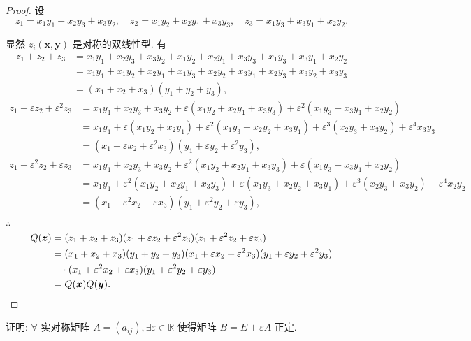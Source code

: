 \documentclass[color=black,device=normal,lang=cn,mode=geye]{elegantnote}
\begin{document}
\begin{proof}
    设
    \[z_1=x_1y_1+x_2y_3+x_3y_2,\quad z_2=x_1y_2+x_2y_1+x_3y_3,\quad z_3=x_1y_3+x_3y_1+x_2y_2.\]

    显然 $z_i(\boldsymbol{x},\boldsymbol{y})$ 是对称的双线性型. 有
    \begin{align*}
        z_1+z_2+z_3 & =x_1y_1+x_2y_3+x_3y_2+x_1y_2+x_2y_1+x_3y_3+x_1y_3+x_3y_1+x_2y_2 \\
        & =x_1y_1+x_1y_2+x_2y_1+x_1y_3+x_2y_2+x_3y_1+x_2y_3+x_3y_2+x_3y_3 \\
        & =(x_1+x_2+x_3)(y_1+y_2+y_3),
    \end{align*}
    \begin{align*}
        z_1+\varepsilon z_2+\varepsilon^2z_3 & =x_1y_1+x_2y_3+x_3y_2+\varepsilon(x_1y_2+x_2y_1+x_3y_3)+\varepsilon^2(x_1y_3+x_3y_1+x_2y_2) \\
        & =x_1y_1+\varepsilon(x_1y_2+x_2y_1)+\varepsilon^2(x_1y_3+x_2y_2+x_3y_1)+\varepsilon^3(x_2y_3+x_3y_2)+\varepsilon^4x_3y_3 \\
        & =(x_1+\varepsilon x_2+\varepsilon^2x_3)(y_1+\varepsilon y_2+\varepsilon^2y_3),
    \end{align*}
    \begin{align*}
        z_1+\varepsilon^2z_2+\varepsilon z_3 & =x_1y_1+x_2y_3+x_3y_2+\varepsilon^2(x_1y_2+x_2y_1+x_3y_3)+\varepsilon(x_1y_3+x_3y_1+x_2y_2) \\
        & =x_1y_1+\varepsilon^2(x_1y_2+x_2y_1+x_3y_3)+\varepsilon(x_1y_3+x_2y_2+x_3y_1)+\varepsilon^3(x_2y_3+x_3y_2)+\varepsilon^4x_2y_2 \\
        & =(x_1+\varepsilon^2x_2+\varepsilon x_3)(y_1+\varepsilon^2y_2+\varepsilon y_3),
    \end{align*}

    $\therefore$
    \begin{align*}
        Q(\boldsymbol{z}) & =(z_1+z_2+z_3)(z_1+\varepsilon z_2+\varepsilon^2z_3)(z_1+\varepsilon^2z_2+\varepsilon z_3) \\
        & =(x_1+x_2+x_3)(y_1+y_2+y_3)(x_1+\varepsilon x_2+\varepsilon^2x_3)(y_1+\varepsilon y_2+\varepsilon^2y_3) \\
        & \quad\cdot(x_1+\varepsilon^2x_2+\varepsilon x_3)(y_1+\varepsilon^2y_2+\varepsilon y_3) \\
        & =Q(\boldsymbol{x})Q(\boldsymbol{y}).\qedhere
    \end{align*}
\end{proof}
\begin{exercise}%
    证明: $\forall$ 实对称矩阵 $A=(a_{ij}),\exists\varepsilon\in\mathbb{R}$ 使得矩阵 $B=E+\varepsilon A$ 正定.
\end{exercise}
\end{document}
